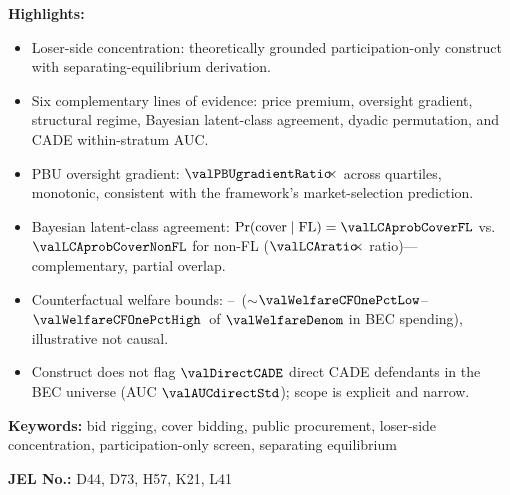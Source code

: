 \noindent\textbf{Highlights:}
\begin{itemize}\setlength{\itemsep}{1pt}
\item Loser-side concentration: theoretically grounded participation-only construct with separating-equilibrium derivation.
\item Six complementary lines of evidence: price premium, oversight gradient, structural regime, Bayesian latent-class agreement, dyadic permutation, and CADE within-stratum AUC.
\item PBU oversight gradient: $\valPBUgradientRatio\!\!\times$ across quartiles, monotonic, consistent with the framework's market-selection prediction.
\item Bayesian latent-class agreement: $\Pr(\text{cover}\mid\text{FL})=\valLCAprobCoverFL$ vs.\ $\valLCAprobCoverNonFL$ for non-FL ($\valLCAratio\!\!\times$ ratio)—complementary, partial overlap.
\item Counterfactual welfare bounds: \valWelfareCrossfit--\valWelfareIV\ ($\sim$$\valWelfareCFOnePctLow$--$\valWelfareCFOnePctHigh$\ of $\valWelfareDenom$ in BEC spending), illustrative not causal.
\item Construct does not flag $\valDirectCADE$ direct CADE defendants in the BEC universe (AUC $\valAUCdirectStd$); scope is explicit and narrow.
\end{itemize}

\bigskip

\noindent\textbf{Keywords:} bid rigging, cover bidding, public procurement, loser-side concentration, participation-only screen, separating equilibrium

\noindent\textbf{JEL No.:} D44, D73, H57, K21, L41

\bigskip

